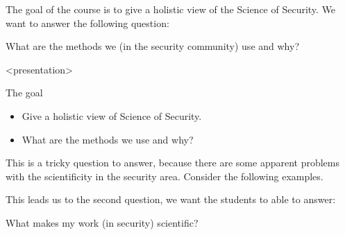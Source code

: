 The goal of the course is to give a holistic view of the Science of Security.
We want to answer the following question:

\begin{frame}
  \begin{question}
    What are the methods we (in the security community) use and why?
  \end{question}
\end{frame}

\begin{frame}<presentation>
  \begin{block}{The goal}
    \begin{itemize}
      \item Give a holistic view of Science of Security.
      \item What are the methods we use and why?
    \end{itemize}
  \end{block}
\end{frame}

This is a tricky question to answer, because there are some apparent problems 
with the scientificity in the security area.
Consider the following examples.

\begin{frame}[fragile]
  \begin{example}\label{SoKProblem1}
  \end{example}

  \pause

  \begin{example}\label{SoKProblem2}
  \end{example}
\end{frame}

This leads us to the second question, we want the students to able to answer:

\begin{frame}
  \begin{question}
    What makes my work (in security) scientific?
  \end{question}
\end{frame}

